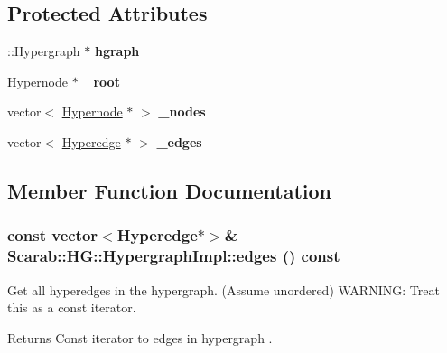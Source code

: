 \subsection*{Protected Attributes}
\begin{DoxyCompactItemize}
\item 
\hypertarget{class_scarab_1_1_h_g_1_1_hypergraph_impl_aa7192cf8f168e5bfed67a8faf85c8cb4}{
::Hypergraph $\ast$ {\bfseries hgraph}}
\label{class_scarab_1_1_h_g_1_1_hypergraph_impl_aa7192cf8f168e5bfed67a8faf85c8cb4}

\item 
\hypertarget{class_scarab_1_1_h_g_1_1_hypergraph_impl_a7035fdae4c04d0752aaaf1e7eba7600e}{
\hyperlink{class_scarab_1_1_h_g_1_1_hypernode}{Hypernode} $\ast$ {\bfseries \_\-root}}
\label{class_scarab_1_1_h_g_1_1_hypergraph_impl_a7035fdae4c04d0752aaaf1e7eba7600e}

\item 
\hypertarget{class_scarab_1_1_h_g_1_1_hypergraph_impl_a4cc57d9255e2f09714c5913d67cd0554}{
vector$<$ \hyperlink{class_scarab_1_1_h_g_1_1_hypernode}{Hypernode} $\ast$ $>$ {\bfseries \_\-nodes}}
\label{class_scarab_1_1_h_g_1_1_hypergraph_impl_a4cc57d9255e2f09714c5913d67cd0554}

\item 
\hypertarget{class_scarab_1_1_h_g_1_1_hypergraph_impl_a56fb710140f3359646b1a17cb0417d74}{
vector$<$ \hyperlink{class_scarab_1_1_h_g_1_1_hyperedge}{Hyperedge} $\ast$ $>$ {\bfseries \_\-edges}}
\label{class_scarab_1_1_h_g_1_1_hypergraph_impl_a56fb710140f3359646b1a17cb0417d74}

\end{DoxyCompactItemize}


\subsection{Member Function Documentation}
\hypertarget{class_scarab_1_1_h_g_1_1_hypergraph_impl_a0c8373e545fe59b0cb7036b4751508e1}{
\subsubsection[{edges}]{\setlength{\rightskip}{0pt plus 5cm}const vector$<${\bf Hyperedge}$\ast$$>$\& Scarab::HG::HypergraphImpl::edges () const}}
\label{class_scarab_1_1_h_g_1_1_hypergraph_impl_a0c8373e545fe59b0cb7036b4751508e1}
Get all hyperedges in the hypergraph. (Assume unordered) WARNING: Treat this as a const iterator. \begin{DoxyReturn}{Returns}
Const iterator to edges in hypergraph . 
\end{DoxyReturn}


